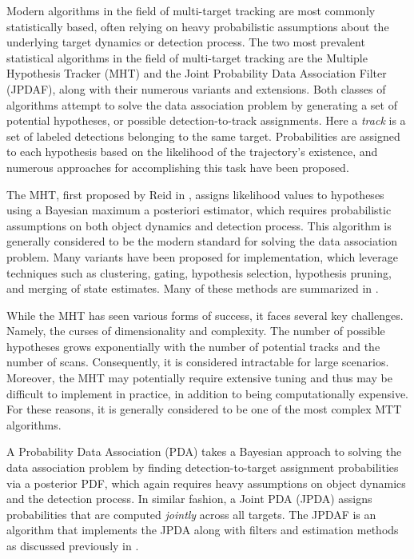 Modern algorithms in the field of multi-target tracking are most commonly statistically based, often relying on heavy probabilistic assumptions about the underlying target dynamics or detection process. The two most prevalent statistical algorithms in the field of multi-target tracking are the Multiple Hypothesis Tracker (MHT) and the Joint Probability Data Association Filter (JPDAF), along with their numerous variants and extensions. Both classes of algorithms attempt to solve the data association problem by generating a set of potential hypotheses, or possible detection-to-track assignments. Here a \textit{track} is a set of labeled detections belonging to the same target. Probabilities are assigned to each hypothesis based on the likelihood of the trajectory's existence, and numerous approaches for accomplishing this task have been proposed.

The MHT, first proposed by Reid in \cite{MHT-Seminal}, assigns likelihood values to hypotheses using a Bayesian maximum a posteriori estimator, which requires probabilistic assumptions on both object dynamics and detection process. This algorithm is generally considered to be the modern standard for solving the data association problem. Many variants have been proposed for implementation, which leverage techniques such as clustering, gating, hypothesis selection, hypothesis pruning, and merging of state estimates. Many of these methods are summarized in \cite{MHT-Overview}. 

While the MHT has seen various forms of success, it faces several key challenges. Namely, the curses of dimensionality and complexity. The number of possible hypotheses grows exponentially with the number of potential tracks and the number of scans. Consequently, it is considered intractable for large scenarios. Moreover, the MHT may potentially require extensive tuning and thus may be difficult to implement in practice, in addition to being computationally expensive. For these reasons, it is generally considered to be one of the most complex MTT algorithms. 

A Probability Data Association (PDA) takes a Bayesian approach to solving the data association problem by finding detection-to-target assignment probabilities via a posterior PDF, which again requires heavy assumptions on object dynamics and the detection process. In similar fashion, a Joint PDA (JPDA) assigns probabilities that are computed \textit{jointly} across all targets. The JPDAF is an algorithm that implements the JPDA along with filters and estimation methods as discussed previously in \cite{Bar-Shalom_MTT}.

